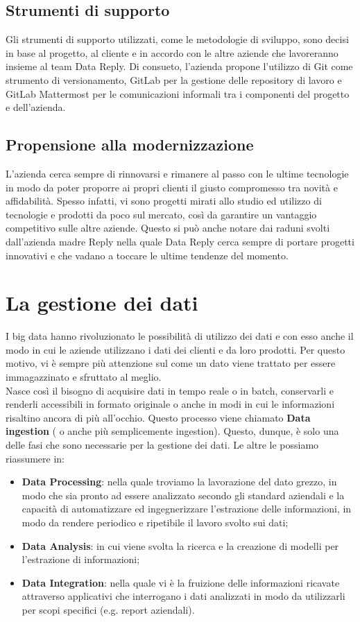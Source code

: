 \subsection{Strumenti di supporto}
Gli strumenti di supporto utilizzati, come le metodologie di sviluppo,  sono decisi in base al progetto, al cliente e in accordo con le altre aziende che lavoreranno insieme al team Data Reply.
Di consueto, l'azienda propone l'utilizzo di \gls{Git} come strumento di versionamento, \gls{GitLab} per la gestione delle repository di lavoro e \gls{GitLab Mattermost} per le comunicazioni informali tra i componenti del progetto e dell'azienda.
\subsection{Propensione alla modernizzazione}
L'azienda cerca sempre di rinnovarsi e rimanere al passo con le ultime tecnologie in modo da poter proporre ai propri clienti il giusto compromesso tra novità e affidabilità. Spesso infatti, vi sono progetti mirati allo studio ed utilizzo di tecnologie e prodotti da poco sul mercato, così da garantire un vantaggio competitivo sulle altre aziende.
Questo si può anche notare dai raduni svolti dall'azienda madre Reply nella quale Data Reply cerca sempre di portare progetti innovativi e che vadano a toccare le ultime tendenze del momento.
\section{La gestione dei dati}
I big data hanno rivoluzionato le possibilità di utilizzo dei dati e con esso anche il modo in cui le aziende utilizzano i dati dei clienti e da loro prodotti. Per questo motivo, vi è sempre più attenzione sul come un dato viene trattato per essere immagazzinato e sfruttato al meglio.
\\
Nasce così il bisogno di acquisire dati in tempo reale o in \gls{batch}, conservarli e renderli accessibili in formato originale o anche in modi in cui le informazioni risaltino ancora di più all'occhio.
Questo processo viene chiamato \textbf{Data ingestion} ( o anche più semplicemente ingestion).
Questo, dunque, è solo una delle fasi che sono necessarie per la gestione dei dati.
Le altre le possiamo riassumere in:
\begin{itemize}
	\item \textbf{Data Processing}: nella quale troviamo la lavorazione del dato grezzo, in modo che sia pronto ad essere analizzato secondo gli standard aziendali e la capacità di automatizzare ed ingegnerizzare l'estrazione delle informazioni, in modo da rendere periodico e ripetibile il lavoro svolto sui dati;
	\item \textbf{Data Analysis}: in cui viene svolta la ricerca e la creazione di modelli per l'estrazione di informazioni;
	\item \textbf{Data Integration}: nella quale vi è la fruizione delle informazioni ricavate attraverso applicativi che interrogano i dati analizzati in modo da utilizzarli per scopi specifici (e.g. report aziendali).
\end{itemize}

